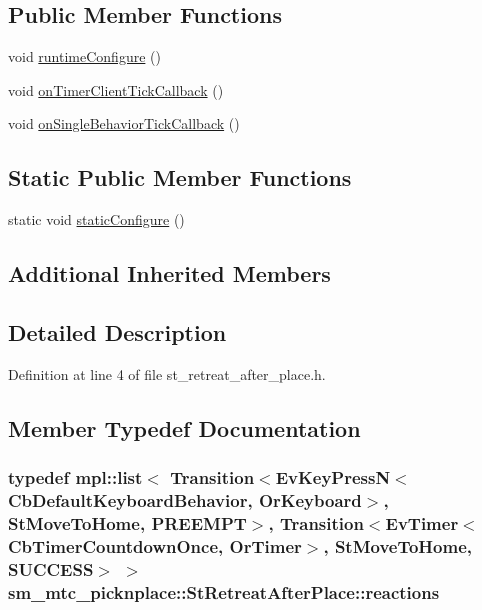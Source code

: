 \subsection*{Public Member Functions}
\begin{DoxyCompactItemize}
\item 
void \hyperlink{structsm__mtc__picknplace_1_1StRetreatAfterPlace_a7293693c74d8c2ca53b531c11e1ca31b}{runtime\+Configure} ()
\item 
void \hyperlink{structsm__mtc__picknplace_1_1StRetreatAfterPlace_acfaadf176b57a48c250661343b1018d8}{on\+Timer\+Client\+Tick\+Callback} ()
\item 
void \hyperlink{structsm__mtc__picknplace_1_1StRetreatAfterPlace_aca72dd5ba5515954b1deb5ce6c1b18bc}{on\+Single\+Behavior\+Tick\+Callback} ()
\end{DoxyCompactItemize}
\subsection*{Static Public Member Functions}
\begin{DoxyCompactItemize}
\item 
static void \hyperlink{structsm__mtc__picknplace_1_1StRetreatAfterPlace_a1f515bb05f0c66451d31e8cb987af77f}{static\+Configure} ()
\end{DoxyCompactItemize}
\subsection*{Additional Inherited Members}


\subsection{Detailed Description}


Definition at line 4 of file st\+\_\+retreat\+\_\+after\+\_\+place.\+h.



\subsection{Member Typedef Documentation}
\subsubsection[{\texorpdfstring{reactions}{reactions}}]{\setlength{\rightskip}{0pt plus 5cm}typedef mpl\+::list$<$ Transition$<$Ev\+Key\+PressN$<$Cb\+Default\+Keyboard\+Behavior, {\bf Or\+Keyboard}$>$, {\bf St\+Move\+To\+Home}, {\bf P\+R\+E\+E\+M\+PT}$>$, Transition$<$Ev\+Timer$<$Cb\+Timer\+Countdown\+Once, {\bf Or\+Timer}$>$, {\bf St\+Move\+To\+Home}, {\bf S\+U\+C\+C\+E\+SS}$>$ $>$ {\bf sm\+\_\+mtc\+\_\+picknplace\+::\+St\+Retreat\+After\+Place\+::reactions}}\hypertarget{structsm__mtc__picknplace_1_1StRetreatAfterPlace_a6a36b90d92506b41620870398c65a2cc}{}\label{structsm__mtc__picknplace_1_1StRetreatAfterPlace_a6a36b90d92506b41620870398c65a2cc}


